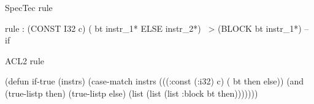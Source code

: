 \begin{slide}
  \vspace*{6mm}
  \noindent\begin{minipage}{.25\textwidth}
    \begin{center}\LARGE SpecTec rule\end{center}
  \end{minipage}\hfill
  \begin{minipage}{.73\textwidth}
\begin{code}{\codesmall\baselineskip8pt}
rule :
  (CONST I32 c) ( bt instr_1* ELSE instr_2*)  ~>  (BLOCK bt instr_1*)
  -- if 
\end{code}
  \end{minipage}\par
  \vspace*{5mm}
  \noindent\begin{minipage}{.25\textwidth}
    \begin{center}\LARGE ACL2 rule\\\end{center}
  \end{minipage}\hfill
  \begin{minipage}{.73\textwidth}
\begin{code}{\codenine\baselineskip11pt}
(defun if-true (instrs)
  (case-match instrs
    (((:const (:i32) c) ( bt then else))
     (and (true-listp then)
          (true-listp else)
          (list (list (list :block bt then)))))))
\end{code}
  \end{minipage}\par
  \vfill
\end{slide}

